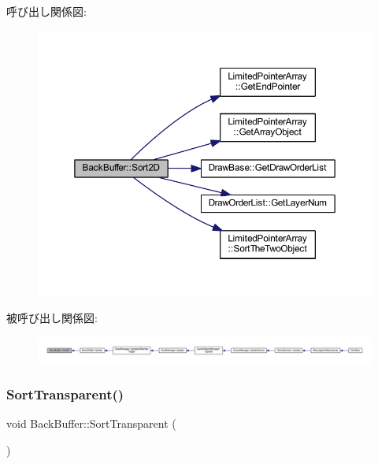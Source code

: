 呼び出し関係図\+:
\nopagebreak
\begin{figure}[H]
\begin{center}
\leavevmode
\includegraphics[width=350pt]{class_back_buffer_a1530979126918a1a76b6555a5d9de9b8_cgraph}
\end{center}
\end{figure}
被呼び出し関係図\+:
\nopagebreak
\begin{figure}[H]
\begin{center}
\leavevmode
\includegraphics[width=350pt]{class_back_buffer_a1530979126918a1a76b6555a5d9de9b8_icgraph}
\end{center}
\end{figure}
\mbox{\label{class_back_buffer_af363b4d69affd48a1b0f65a000ff12b5}} 
\subsubsection{\texorpdfstring{Sort\+Transparent()}{SortTransparent()}}
{\footnotesize\ttfamily void Back\+Buffer\+::\+Sort\+Transparent (\begin{DoxyParamCaption}{ }\end{DoxyParamCaption})\hspace{0.3cm}{\ttfamily [private]}}



